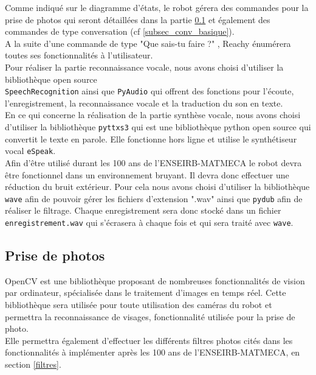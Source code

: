 Comme indiqué sur le diagramme d'états, le robot gérera des commandes pour la prise de photos qui seront détaillées dans la partie \ref{subsec_prise_photo} et également des commandes de type conversation (cf \ref{subsec_conv_basique}). \\

A la suite d'une commande de type "Que sais-tu faire ?" , Reachy énumérera toutes ses fonctionnalités à l'utilisateur. \\

Pour réaliser la partie reconnaissance vocale, nous avons choisi d'utiliser la bibliothèque open source \\ \texttt{SpeechRecognition} ainsi que \texttt{PyAudio} qui offrent des fonctions pour l'écoute, l'enregistrement, la reconnaissance vocale et la traduction du son en texte. \\

En ce qui concerne la réalisation de la partie synthèse vocale, nous avons choisi d'utiliser la bibliothèque \texttt{pyttxs3} qui est une bibliothèque python open source qui convertit le texte en parole. Elle fonctionne hors ligne et utilise le synthétiseur vocal \texttt{eSpeak}. \\

Afin d'être utilisé durant les 100 ans de l'ENSEIRB-MATMECA le robot devra être fonctionnel dans un environnement bruyant. Il devra donc effectuer une réduction du bruit extérieur. Pour cela nous avons choisi d'utiliser la bibliothèque \texttt{wave} afin de pouvoir gérer les fichiers d'extension ".wav" ainsi que \texttt{pydub} afin de réaliser le filtrage. Chaque enregistrement sera donc stocké dans un fichier \texttt{enregistrement.wav} qui s'écrasera à chaque fois et qui sera traité avec \texttt{wave}.

\subsection{Prise de photos} \label{subsec_prise_photo}
OpenCV est une bibliothèque proposant de nombreuses fonctionnalités de vision par ordinateur, spécialisée dans le traitement d'images en temps réel. Cette bibliothèque sera utilisée pour toute utilisation des caméras du robot et permettra la reconnaissance de visages, fonctionnalité utilisée pour la prise de photo.\\ Elle permettra également d'effectuer les différents filtres photos cités dans les fonctionnalités à implémenter après les 100 ans de l'ENSEIRB-MATMECA, en section \ref{filtres}.\\

